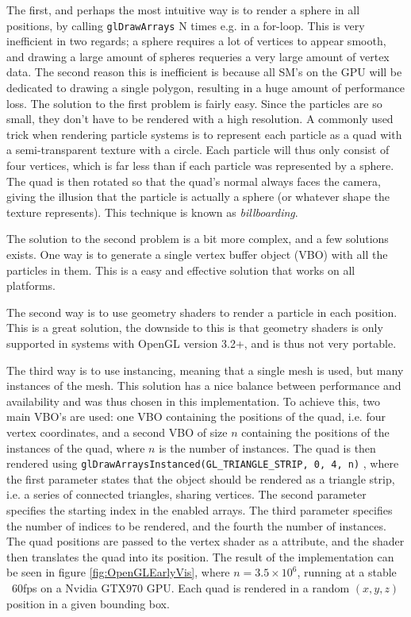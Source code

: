 The first, and perhaps the most intuitive way is to render a sphere in all positions, by calling \lstinline{glDrawArrays} N times e.g. in a for-loop. This is very inefficient in two regards; a sphere requires a lot of vertices to appear smooth, and drawing a large amount of spheres requeries a very large amount of vertex data. The second reason this is inefficient is because all SM's on the GPU will be dedicated to drawing a single polygon, resulting in a huge amount of performance loss. The solution to the first problem is fairly easy. Since the particles are so small, they don't have to be rendered with a high resolution. A commonly used trick when rendering particle systems is to represent each particle as a quad with a semi-transparent texture with a circle. Each particle will thus only consist of four vertices, which is far less than if each particle was represented by a sphere. The quad is then rotated so that the quad's normal always faces the camera, giving the illusion that the particle is actually a sphere (or whatever shape the texture represents). This technique is known as \textit{billboarding}.

The solution to the second problem is a bit more complex, and a few solutions exists.
One way is to generate a single vertex buffer object (VBO) with all the particles in them. This is a easy and effective solution that works on all platforms. 

The second way is to use geometry shaders to render a particle in each position. This is a great solution, the downside to this is that geometry shaders is only supported in systems with OpenGL version 3.2+, and is thus not very portable. 

The third way is to use instancing, meaning that a single mesh is used, but many instances of the mesh. This solution has a nice balance between performance and availability and was thus chosen in this implementation. To achieve this, two main VBO's are used: one VBO containing the positions of the quad, i.e. four vertex coordinates, and a second VBO of size $n$ containing the positions of the instances of the quad, where $n$ is the number of instances. The quad is then rendered using \lstinline{glDrawArraysInstanced(GL_TRIANGLE_STRIP, 0, 4, n)} \cite{OpenCLDocs}, where the first parameter states that the object should be rendered as a triangle strip, i.e. a series of connected triangles, sharing vertices. The second parameter specifies the starting index in the enabled arrays. The third parameter specifies the number of indices to be rendered, and the fourth the number of instances. The quad positions are passed to the vertex shader as a attribute, and the shader then translates the quad into its position. The result of the implementation can be seen in figure \ref{fig:OpenGLEarlyVis}, where $n=3.5 \times 10^6$, running at a stable ~60fps on a Nvidia GTX970 GPU. Each quad is rendered in a random $(x,y,z)$ position in a given bounding box.


